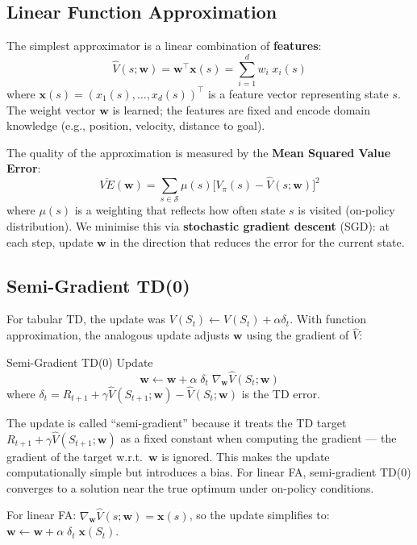 \documentclass[11pt,a4paper]{article}
\newcommand{\term}[1]{\textcolor{DefGreen}{\textbf{#1}}}
\begin{document}
\subsection{Linear Function Approximation}

The simplest approximator is a linear combination of \term{features}:
\[
\hat{V}(s;\mathbf{w}) = \mathbf{w}^\top \mathbf{x}(s) = \sum_{i=1}^d w_i\;x_i(s)
\]
where $\mathbf{x}(s) = (x_1(s),\ldots,x_d(s))^\top$ is a feature vector representing state $s$. The weight vector $\mathbf{w}$ is learned; the features are fixed and encode domain knowledge (e.g., position, velocity, distance to goal).

The quality of the approximation is measured by the \term{Mean Squared Value Error}:
\[
\overline{VE}(\mathbf{w}) = \sum_{s\in\mathcal{S}} \mu(s)\bigl[V_\pi(s) - \hat{V}(s;\mathbf{w})\bigr]^2
\]
where $\mu(s)$ is a weighting that reflects how often state $s$ is visited (on-policy distribution). We minimise this via \term{stochastic gradient descent} (SGD): at each step, update $\mathbf{w}$ in the direction that reduces the error for the current state.

\subsection{Semi-Gradient TD(0)}

For tabular TD, the update was $V(S_t) \leftarrow V(S_t) + \alpha\delta_t$. With function approximation, the analogous update adjusts $\mathbf{w}$ using the gradient of $\hat{V}$:

\begin{defbox}{Semi-Gradient TD(0) Update}
\[
\mathbf{w} \leftarrow \mathbf{w} + \alpha\;\delta_t\;\nabla_{\mathbf{w}}\hat{V}(S_t;\mathbf{w})
\]
where $\delta_t = R_{t+1} + \gamma\hat{V}(S_{t+1};\mathbf{w}) - \hat{V}(S_t;\mathbf{w})$ is the TD error.
\end{defbox}

The update is called ``semi-gradient'' because it treats the TD target $R_{t+1}+\gamma\hat{V}(S_{t+1};\mathbf{w})$ as a fixed constant when computing the gradient --- the gradient of the target w.r.t.\ $\mathbf{w}$ is ignored. This makes the update computationally simple but introduces a bias. For linear FA, semi-gradient TD(0) converges to a solution near the true optimum under on-policy conditions.

For linear FA: $\nabla_\mathbf{w}\hat{V}(s;\mathbf{w}) = \mathbf{x}(s)$, so the update simplifies to: $\mathbf{w} \leftarrow \mathbf{w} + \alpha\;\delta_t\;\mathbf{x}(S_t)$.
\end{document}
